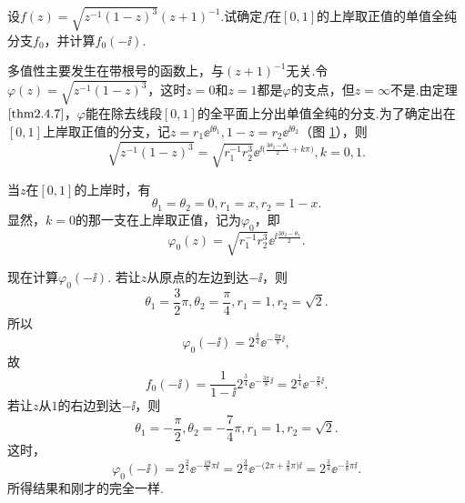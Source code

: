 \begin{example}\label{exam2.4.9}
  设$f(z)=\sqrt{z^{-1}(1-z)^3}(z+1)^{-1}$.试确定$f$在$[0,1]$的上岸取正值的单值全纯分支$f_0$，并计算$f_0(-\ii)$.
\end{example}
\begin{solution}
  多值性主要发生在带根号的函数上，与$(z+1)^{-1}$无关.令$\varphi(z)=\sqrt{z^{-1}(1-z)^3}$，这时$z=0$和$z=1$都是$\varphi$的支点，但$z=\infty$不是.由定理  $\ref{thm2.4.7}$，$\varphi$能在除去线段$[0,1]$的全平面上分出单值全纯的分支.为了确定出在$[0,1]$上岸取正值的分支，记$z=r_1\ee^{\ii\theta_1},1-z=r_2\ee^{\ii\theta_2}$（图 \ref{fig2.9}），则
  \[
    \sqrt{z^{-1}(1-z)^3} = \sqrt{r_1^{-1}r_2^3}
    \ee^{\ii\big(\frac{3\theta_2-\theta_1}2+k\pi\big)},k=0,1.
  \]
  \begin{figure}[!ht]
    \centering
    \caption{\label{fig2.9}}
  \end{figure}
  当$z$在$[0,1]$的上岸时，有
  \[
    \theta_1 = \theta_2 = 0,r_1 = x,r_2 = 1-x.
  \]
  显然，$k=0$的那一支在上岸取正值，记为$\varphi_0$，即
  \[
    \varphi_0(z) = \sqrt{r_1^{-1}r_2^3}
    \ee^{\ii\frac{3\theta_2-\theta_1}2}.
  \]

  现在计算$\varphi_0(-\ii)$. 若让$z$从原点的左边到达$-\ii$，则
  \[
    \theta_1 = \frac32\pi,\theta_2 = \frac\pi4,r_1 = 1,r_2 = \sqrt2.
  \]
  所以
  \[
    \varphi_0(-\ii) = 2^{\frac34}\ee^{-\frac{3\pi}8\ii},
  \]
  故
  \[
    f_0(-\ii) = \frac1{1-\ii}2^{\frac34}\ee^{-\frac{3\pi}8\ii} = 2^{\frac14}\ee^{
    -\frac\pi8\ii}.
  \]
  若让$z$从$1$的右边到达$-\ii$，则
  \[
    \theta_1 = -\frac\pi2,\theta_2 = -\frac74\pi,r_1 = 1,r_2 = \sqrt2.
  \]
  这时，
  \[
    \varphi_0(-\ii) = 2^{\frac34}\ee^{-\frac{19}8\pi\ii} = 2^{\frac34}\ee^{-
    \big(2\pi+\frac38\pi\big)\ii} = 2^{\frac34}\ee^{-\frac38\pi\ii}.
  \]
  所得结果和刚才的完全一样.
\end{solution}

